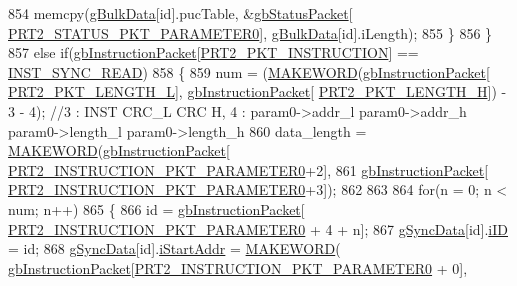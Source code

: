 \begin{DoxyCode}
854                 memcpy(\hyperlink{classdynamixel2_a5083923283d17a820b3deb940c7211a5}{gBulkData}[\textcolor{keywordtype}{id}].pucTable, &\hyperlink{classdynamixel2_a0776f210a190cf57d1a6faf9697a593d}{gbStatusPacket}[
      \hyperlink{dynamixel_8h_a7c79167a35ad785b57c7c8de66c59e5c}{PRT2\_STATUS\_PKT\_PARAMETER0}], \hyperlink{classdynamixel2_a5083923283d17a820b3deb940c7211a5}{gBulkData}[\textcolor{keywordtype}{id}].iLength);
855             \}
856         \}
857         \textcolor{keywordflow}{else} \textcolor{keywordflow}{if}(\hyperlink{classdynamixel2_a298efe9115fdbf77019af1001e801fb4}{gbInstructionPacket}[\hyperlink{dynamixel_8h_aece9dd9d7c0fa1714d53c568865d79ad}{PRT2\_PKT\_INSTRUCTION}] == 
      \hyperlink{dynamixel_8h_a2c0994e6f77bcf585d7dfde88c10441f}{INST\_SYNC\_READ})
858         \{
859             num = (\hyperlink{dynamixel_8h_a6b98c16b8e3e7733dd4063d0b0fac24c}{MAKEWORD}(\hyperlink{classdynamixel2_a298efe9115fdbf77019af1001e801fb4}{gbInstructionPacket}[
      \hyperlink{dynamixel_8h_a9e77ab568957b64786c810967dec8b0c}{PRT2\_PKT\_LENGTH\_L}], \hyperlink{classdynamixel2_a298efe9115fdbf77019af1001e801fb4}{gbInstructionPacket}[
      \hyperlink{dynamixel_8h_a5ea18a21d722bf72217d5408c4d2a868}{PRT2\_PKT\_LENGTH\_H}]) - 3 - 4); \textcolor{comment}{//3 : INST  CRC\_L CRC H, 4 : param0->addr\_l param0->addr\_h
       param0->length\_l param0->length\_h }
860             data\_length = \hyperlink{dynamixel_8h_a6b98c16b8e3e7733dd4063d0b0fac24c}{MAKEWORD}(\hyperlink{classdynamixel2_a298efe9115fdbf77019af1001e801fb4}{gbInstructionPacket}[
      \hyperlink{dynamixel_8h_a349ccb89ae957bdcc16856ec8e2dcb00}{PRT2\_INSTRUCTION\_PKT\_PARAMETER0}+2], 
861                 \hyperlink{classdynamixel2_a298efe9115fdbf77019af1001e801fb4}{gbInstructionPacket}[
      \hyperlink{dynamixel_8h_a349ccb89ae957bdcc16856ec8e2dcb00}{PRT2\_INSTRUCTION\_PKT\_PARAMETER0}+3]);
862 
863 
864             \textcolor{keywordflow}{for}(n = 0; n < num; n++)
865             \{
866                 \textcolor{keywordtype}{id} = \hyperlink{classdynamixel2_a298efe9115fdbf77019af1001e801fb4}{gbInstructionPacket}[
      \hyperlink{dynamixel_8h_a349ccb89ae957bdcc16856ec8e2dcb00}{PRT2\_INSTRUCTION\_PKT\_PARAMETER0} + 4 + n];
867                 \hyperlink{classdynamixel2_a5923ec2418ab7ea83cbe365ad8b200d5}{gSyncData}[id].\hyperlink{structdata_a5a553f5c59b2c973d161ea3352c32d07}{iID} = id;
868                 \hyperlink{classdynamixel2_a5923ec2418ab7ea83cbe365ad8b200d5}{gSyncData}[id].\hyperlink{structdata_a849125c9807b08e525118cdca5a255fe}{iStartAddr} = \hyperlink{dynamixel_8h_a6b98c16b8e3e7733dd4063d0b0fac24c}{MAKEWORD}(
      \hyperlink{classdynamixel2_a298efe9115fdbf77019af1001e801fb4}{gbInstructionPacket}[\hyperlink{dynamixel_8h_a349ccb89ae957bdcc16856ec8e2dcb00}{PRT2\_INSTRUCTION\_PKT\_PARAMETER0} + 0],
       

\end{DoxyCode}
